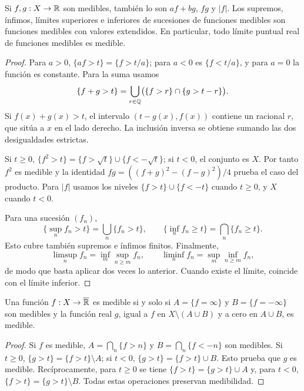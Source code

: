\begin{teorema}\label{teo:v2-algebra-medibles}
Si $f,g:X\to\mathbb R$ son medibles, también lo son $af+bg$, $fg$ y $|f|$. Los supremos, ínfimos, límites superiores e inferiores de sucesiones de funciones medibles son funciones medibles con valores extendidos. En particular, todo límite puntual real de funciones medibles es medible.
\end{teorema}
\begin{proof}
Para $a>0$, $\{af>t\}=\{f>t/a\}$; para $a<0$ es $\{f<t/a\}$, y para $a=0$ la función es constante. Para la suma usamos
\[\{f+g>t\}=\bigcup_{r\in\mathbb Q}\bigl(\{f>r\}\cap\{g>t-r\}\bigr).\]
Si $f(x)+g(x)>t$, el intervalo $(t-g(x),f(x))$ contiene un racional $r$, que sitúa a $x$ en el lado derecho. La inclusión inversa se obtiene sumando las dos desigualdades estrictas.

Si $t\ge0$, $\{f^2>t\}=\{f>\sqrt t\}\cup\{f<-\sqrt t\}$; si $t<0$, el conjunto es $X$. Por tanto $f^2$ es medible y la identidad $fg=((f+g)^2-(f-g)^2)/4$ prueba el caso del producto. Para $|f|$ usamos los niveles $\{f>t\}\cup\{f<-t\}$ cuando $t\ge0$, y $X$ cuando $t<0$.

Para una sucesión $(f_n)$,
\[\{\sup_nf_n>t\}=\bigcup_n\{f_n>t\},\qquad
\{\inf_nf_n\ge t\}=\bigcap_n\{f_n\ge t\}.\]
Esto cubre también supremos e ínfimos finitos. Finalmente,
\[\limsup_nf_n=\inf_m\sup_{n\ge m}f_n,\qquad
\liminf_nf_n=\sup_m\inf_{n\ge m}f_n,\]
de modo que basta aplicar dos veces lo anterior. Cuando existe el límite, coincide con el límite inferior.
\end{proof}

\begin{proposicion}\label{prop:v2-infinitos}
Una función $f:X\to\overline{\mathbb R}$ es medible si y solo si $A=\{f=\infty\}$ y $B=\{f=-\infty\}$ son medibles y la función real $g$, igual a $f$ en $X\setminus(A\cup B)$ y a cero en $A\cup B$, es medible.
\end{proposicion}
\begin{proof}
Si $f$ es medible, $A=\bigcap_n\{f>n\}$ y $B=\bigcap_n\{f<-n\}$ son medibles. Si $t\ge0$, $\{g>t\}=\{f>t\}\setminus A$; si $t<0$, $\{g>t\}=\{f>t\}\cup B$. Esto prueba que $g$ es medible. Recíprocamente, para $t\ge0$ se tiene $\{f>t\}=\{g>t\}\cup A$ y, para $t<0$, $\{f>t\}=\{g>t\}\setminus B$. Todas estas operaciones preservan medibilidad.
\end{proof}

